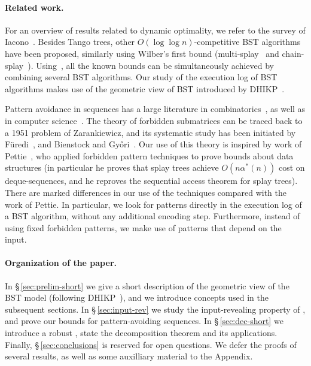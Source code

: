 \paragraph{Related work.}
For an overview of results related to dynamic optimality, we refer to the survey of Iacono~\cite{in_pursuit}. 
Besides Tango trees, other $O(\log\log n)$-competitive BST algorithms have been proposed, similarly using Wilber's first bound (multi-splay~\cite{multisplay} and chain-splay~\cite{chain_splay}). Using~\cite{DemaineILO13}, all the known bounds can be simultaneously achieved by combining several BST algorithms. Our study of the execution log of BST algorithms makes use of the geometric view of BST introduced by DHIKP~\cite{DHIKP09}. 

Pattern avoidance in sequences has a large literature in combinatorics~\cite{Vatter,kitaev}, as well as in computer science~\cite{BrunerL13,knuth68, tarjan_sorting, pratt_queues, separable}. The theory of forbidden submatrices can be traced back to a 1951 problem of Zarankiewicz, and its systematic study has been initiated by F\"{u}redi~\cite{furedi}, and Bienstock and Gy\H{o}ri~\cite{bienstock_gyori}. Our use of this theory is inspired by work of Pettie~\cite{pettie_DS, deque_Pet08}, who applied forbidden pattern techniques to prove bounds about data structures (in particular he proves that splay trees achieve $O(n\alpha^{\ast}(n))$ cost on deque-sequences, and he reproves the sequential access theorem for splay trees). There are marked differences in our use of the techniques compared with the work of Pettie. In particular, we look for patterns directly in the execution log of a BST algorithm, without any additional encoding step. Furthermore, instead of using fixed forbidden patterns, we make use of patterns that depend on the input. 

\paragraph{Organization of the paper.} In \S\,\ref{sec:prelim-short} we give a short description of the geometric view of the BST model (following DHIKP~\cite{DHIKP09}), and we introduce concepts used in the subsequent sections. In \S\,\ref{sec:input-rev} we study the input-revealing property of \greedy, and prove our bounds for pattern-avoiding sequences. In \S\,\ref{sec:dec-short} we introduce a robust \greedy, state the decomposition theorem and its applications. Finally, \S\,\ref{sec:conclusions} is reserved for open questions. We defer the proofs of several results, as well as some auxilliary material to the Appendix.



